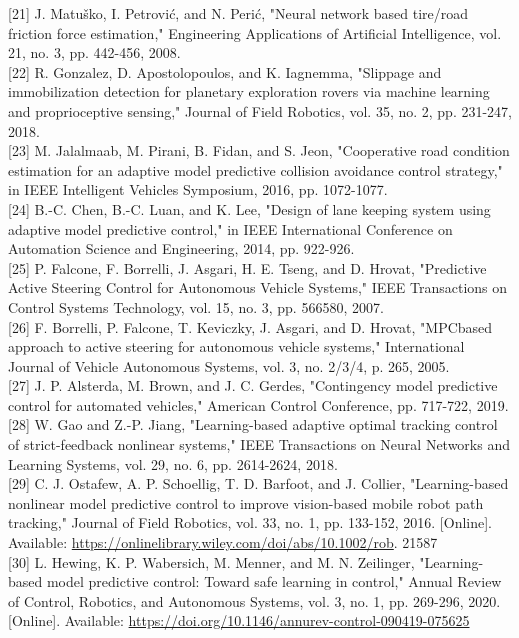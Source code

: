 \documentclass[10pt]{article}
\begin{document}
[21] J. Matuško, I. Petrović, and N. Perić, "Neural network based tire/road friction force estimation," Engineering Applications of Artificial Intelligence, vol. 21, no. 3, pp. 442-456, 2008.\\[0pt]
[22] R. Gonzalez, D. Apostolopoulos, and K. Iagnemma, "Slippage and immobilization detection for planetary exploration rovers via machine learning and proprioceptive sensing," Journal of Field Robotics, vol. 35, no. 2, pp. 231-247, 2018.\\[0pt]
[23] M. Jalalmaab, M. Pirani, B. Fidan, and S. Jeon, "Cooperative road condition estimation for an adaptive model predictive collision avoidance control strategy," in IEEE Intelligent Vehicles Symposium, 2016, pp. 1072-1077.\\[0pt]
[24] B.-C. Chen, B.-C. Luan, and K. Lee, "Design of lane keeping system using adaptive model predictive control," in IEEE International Conference on Automation Science and Engineering, 2014, pp. 922-926.\\[0pt]
[25] P. Falcone, F. Borrelli, J. Asgari, H. E. Tseng, and D. Hrovat, "Predictive Active Steering Control for Autonomous Vehicle Systems," IEEE Transactions on Control Systems Technology, vol. 15, no. 3, pp. 566580, 2007.\\[0pt]
[26] F. Borrelli, P. Falcone, T. Keviczky, J. Asgari, and D. Hrovat, "MPCbased approach to active steering for autonomous vehicle systems," International Journal of Vehicle Autonomous Systems, vol. 3, no. 2/3/4, p. 265, 2005.\\[0pt]
[27] J. P. Alsterda, M. Brown, and J. C. Gerdes, "Contingency model predictive control for automated vehicles," American Control Conference, pp. 717-722, 2019.\\[0pt]
[28] W. Gao and Z.-P. Jiang, "Learning-based adaptive optimal tracking control of strict-feedback nonlinear systems," IEEE Transactions on Neural Networks and Learning Systems, vol. 29, no. 6, pp. 2614-2624, 2018.\\[0pt]
[29] C. J. Ostafew, A. P. Schoellig, T. D. Barfoot, and J. Collier, "Learning-based nonlinear model predictive control to improve vision-based mobile robot path tracking," Journal of Field Robotics, vol. 33, no. 1, pp. 133-152, 2016. [Online]. Available: \href{https://onlinelibrary.wiley.com/doi/abs/10.1002/rob}{https://onlinelibrary.wiley.com/doi/abs/10.1002/rob}. 21587\\[0pt]
[30] L. Hewing, K. P. Wabersich, M. Menner, and M. N. Zeilinger, "Learning-based model predictive control: Toward safe learning in control," Annual Review of Control, Robotics, and Autonomous Systems, vol. 3, no. 1, pp. 269-296, 2020. [Online]. Available: \href{https://doi.org/10.1146/annurev-control-090419-075625}{https://doi.org/10.1146/annurev-control-090419-075625}\\[0pt]
\end{document}
